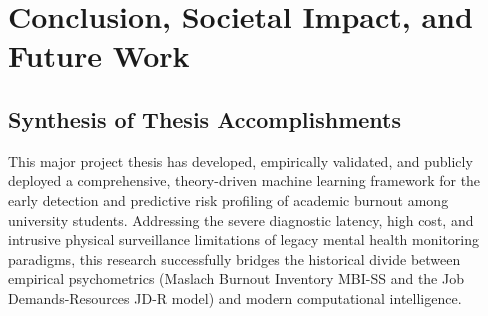 \documentclass[12pt,a4paper,oneside]{report}
\begin{document}
\chapter{Conclusion, Societal Impact, and Future Work}
\label{ch:conclusion}

\section{Synthesis of Thesis Accomplishments}
\label{sec:thesis_synthesis}
This major project thesis has developed, empirically validated, and publicly deployed a comprehensive, theory-driven machine learning framework for the early detection and predictive risk profiling of academic burnout among university students. Addressing the severe diagnostic latency, high cost, and intrusive physical surveillance limitations of legacy mental health monitoring paradigms, this research successfully bridges the historical divide between empirical psychometrics (Maslach Burnout Inventory MBI-SS and the Job Demands-Resources JD-R model) and modern computational intelligence.
\end{document}
